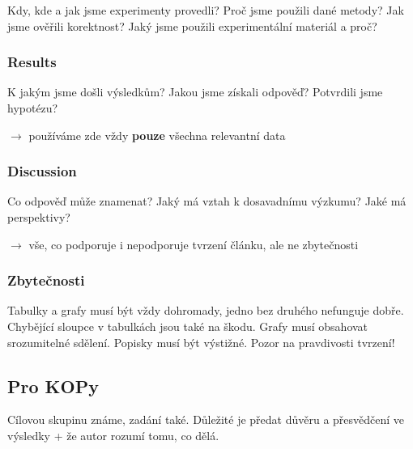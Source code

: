 Kdy, kde a jak jsme experimenty provedli? Proč jsme použili dané metody? Jak jsme ověřili korektnost? Jaký jsme použili experimentální materiál a proč?

\subsubsection{Results}

K jakým jsme došli výsledkům? Jakou jsme získali odpověď? Potvrdili jsme hypotézu?

$\to$ používáme zde vždy \textbf{pouze} všechna relevantní data

\subsubsection{Discussion}

Co odpověď může znamenat? Jaký má vztah k dosavadnímu výzkumu? Jaké má perspektivy?

$\to$ vše, co podporuje i nepodporuje tvrzení článku, ale ne zbytečnosti

\subsubsection{Zbytečnosti}

Tabulky a grafy musí být vždy dohromady, jedno bez druhého nefunguje dobře. Chybějící sloupce v tabulkách jsou také na škodu. Grafy musí obsahovat srozumitelné sdělení. Popisky musí být výstižné. Pozor na pravdivosti tvrzení!

\subsection{Pro KOPy}

Cílovou skupinu známe, zadání také. Důležité je předat důvěru a přesvědčení ve výsledky + že autor rozumí tomu, co dělá.